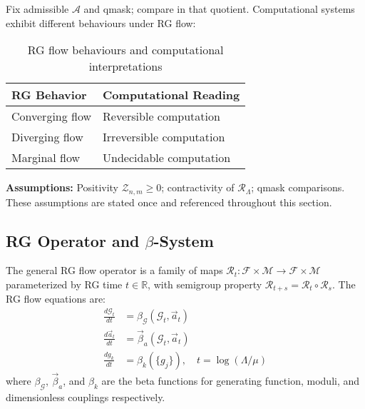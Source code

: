 \begin{definition}
\label{def:rg-flow-classification}
Fix admissible $\mathcal{A}$ and qmask; compare in that quotient. Computational systems exhibit different behaviours under RG flow:

\begin{table}[h]
\centering
\begin{tabular}{|l|l|}
\hline
\textbf{RG Behavior} & \textbf{Computational Reading} \\
\hline
Converging flow & Reversible computation \\
Diverging flow & Irreversible computation \\
Marginal flow & Undecidable computation \\
\hline
\end{tabular}
\caption{RG flow behaviours and computational interpretations}
\end{table}
\end{definition}

\begin{notation}[Assumptions]
\label{not:assumptions}
\textbf{Assumptions:} Positivity $\mathcal{Z}_{n,m}\ge0$; contractivity of $\mathcal{R}_\Lambda$; qmask comparisons. These assumptions are stated once and referenced throughout this section.
\end{notation}

\subsection{RG Operator and $\beta$-System}

\begin{definition}
\label{def:rg-operator-beta-system}
The general RG flow operator is a family of maps $\mathcal{R}_t: \mathcal{F} \times \mathcal{M} \to \mathcal{F} \times \mathcal{M}$ parameterized by RG time $t \in \mathbb{R}$, with semigroup property $\mathcal{R}_{t+s} = \mathcal{R}_t \circ \mathcal{R}_s$. The RG flow equations are:
\begin{align}
\frac{d\mathcal{G}_t}{dt} &= \beta_{\mathcal{G}}(\mathcal{G}_t, \vec{a}_t) \\
\frac{d\vec{a}_t}{dt} &= \vec{\beta}_a(\mathcal{G}_t, \vec{a}_t) \\
\frac{dg_k}{dt} &= \beta_k(\{g_j\}), \quad t = \log(\Lambda/\mu)
\end{align}
where $\beta_{\mathcal{G}}$, $\vec{\beta}_a$, and $\beta_k$ are the beta functions for generating function, moduli, and dimensionless couplings respectively.
\end{definition}

